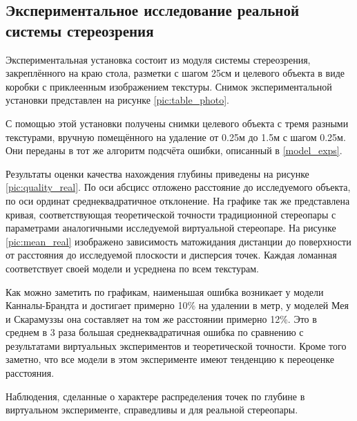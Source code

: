 \subsection{Экспериментальное исследование реальной системы стереозрения}

Экспериментальная установка состоит из модуля системы стереозрения, закреплённого на краю стола, 
разметки с шагом 25см и целевого объекта в виде коробки с приклеенным изображением текстуры. Снимок 
экспериментальной установки представлен на рисунке \ref{pic:table_photo}. 


С помощью этой установки получены снимки целевого объекта с тремя разными текстурами, вручную помещённого на
удаление от 0.25м до 1.5м с шагом 0.25м. Они переданы в тот же алгоритм подсчёта ошибки, описанный в \ref{model_exps}. 

Результаты оценки качества нахождения глубины приведены на рисунке \ref{pic:quality_real}. По оси абсцисс 
отложено расстояние до исследуемого объекта, по оси ординат среднеквадратичное отклонение. На графике так же 
представлена кривая, соответствующая теоретической точности традиционной стереопары с параметрами аналогичными 
исследуемой виртуальной стереопаре. На рисунке \ref{pic:mean_real}
 изображено зависимость матожидания дистанции до поверхности от расстояния до исследуемой плоскости и дисперсия точек.
Каждая ломанная соответствует своей модели и усреднена по всем текстурам.



Как можно заметить по графикам, наименьшая ошибка возникает у модели Канналы-Брандта и достигает примерно 10\%  на удалении в метр, 
у моделей Мея и Скарамуззы она составляет на том же расстоянии примерно 12\%. Это в среднем в 3 раза большая среднеквадратичная 
ошибка по сравнению с результатами виртуальных экспериментов и теоретической точности. Кроме того заметно, что все модели в этом эксперименте имеют тенденцию
к переоценке расстояния.  

Наблюдения, сделанные о характере распределения точек по глубине в виртуальном эксперименте, справедливы и для 
реальной стереопары.




